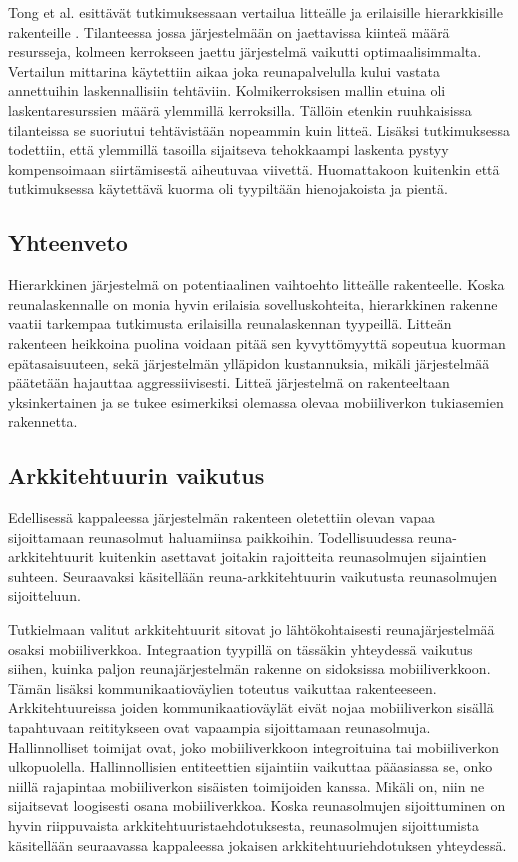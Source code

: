 Tong et al. esittävät tutkimuksessaan vertailua litteälle ja erilaisille hierarkkisille rakenteille \cite{tong2016hierarchical}. Tilanteessa jossa järjestelmään on jaettavissa kiinteä määrä resursseja, kolmeen kerrokseen jaettu järjestelmä vaikutti optimaalisimmalta.
Vertailun mittarina käytettiin aikaa joka reunapalvelulla kului vastata annettuihin laskennallisiin tehtäviin. Kolmikerroksisen mallin etuina oli laskentaresurssien määrä ylemmillä kerroksilla. Tällöin etenkin ruuhkaisissa tilanteissa se suoriutui tehtävistään nopeammin kuin litteä. Lisäksi tutkimuksessa todettiin, että ylemmillä tasoilla sijaitseva tehokkaampi laskenta pystyy kompensoimaan siirtämisestä aiheutuvaa viivettä. Huomattakoon kuitenkin että tutkimuksessa käytettävä kuorma oli tyypiltään hienojakoista ja pientä. 


\subsection{Yhteenveto}
Hierarkkinen järjestelmä on potentiaalinen vaihtoehto litteälle rakenteelle. Koska reunalaskennalle on monia hyvin erilaisia sovelluskohteita, hierarkkinen rakenne vaatii tarkempaa tutkimusta erilaisilla reunalaskennan tyypeillä. Litteän rakenteen heikkoina puolina voidaan pitää sen kyvyttömyyttä sopeutua kuorman epätasaisuuteen, sekä järjestelmän ylläpidon kustannuksia, mikäli järjestelmää päätetään hajauttaa aggressiivisesti. Litteä järjestelmä on rakenteeltaan yksinkertainen ja se tukee esimerkiksi olemassa olevaa mobiiliverkon tukiasemien rakennetta. 


\subsection{Arkkitehtuurin vaikutus}
Edellisessä kappaleessa järjestelmän rakenteen oletettiin olevan vapaa sijoittamaan reunasolmut haluamiinsa paikkoihin. 
Todellisuudessa reuna-arkkitehtuurit kuitenkin asettavat joitakin rajoitteita reunasolmujen sijaintien suhteen. Seuraavaksi käsitellään reuna-arkkitehtuurin vaikutusta reunasolmujen sijoitteluun.

Tutkielmaan valitut arkkitehtuurit sitovat jo lähtökohtaisesti reunajärjestelmää osaksi mobiiliverkkoa. Integraation tyypillä on tässäkin yhteydessä vaikutus siihen, kuinka paljon reunajärjestelmän rakenne on sidoksissa mobiiliverkkoon.
Tämän lisäksi kommunikaatioväylien toteutus vaikuttaa rakenteeseen. 
Arkkitehtuureissa joiden kommunikaatioväylät eivät nojaa mobiiliverkon sisällä tapahtuvaan reititykseen ovat vapaampia sijoittamaan reunasolmuja. 
Hallinnolliset toimijat ovat, joko mobiiliverkkoon integroituina tai mobiiliverkon ulkopuolella. Hallinnollisien entiteettien sijaintiin vaikuttaa pääasiassa se, onko niillä rajapintaa mobiiliverkon sisäisten toimijoiden kanssa. Mikäli on, niin ne sijaitsevat loogisesti osana mobiiliverkkoa. 
Koska reunasolmujen sijoittuminen on hyvin riippuvaista arkkitehtuuristaehdotuksesta, reunasolmujen sijoittumista käsitellään seuraavassa kappaleessa jokaisen arkkitehtuuriehdotuksen yhteydessä.


